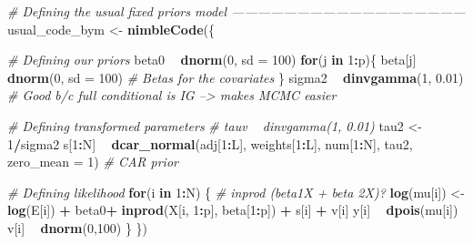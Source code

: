 \documentclass[]{article}
\newenvironment{Shaded}{\begin{snugshade}}{\end{snugshade}}
\newcommand{\CommentTok}[1]{\textcolor[rgb]{0.56,0.35,0.01}{\textit{#1}}}
\newcommand{\ControlFlowTok}[1]{\textcolor[rgb]{0.13,0.29,0.53}{\textbf{#1}}}
\newcommand{\DataTypeTok}[1]{\textcolor[rgb]{0.13,0.29,0.53}{#1}}
\newcommand{\DecValTok}[1]{\textcolor[rgb]{0.00,0.00,0.81}{#1}}
\newcommand{\FloatTok}[1]{\textcolor[rgb]{0.00,0.00,0.81}{#1}}
\newcommand{\KeywordTok}[1]{\textcolor[rgb]{0.13,0.29,0.53}{\textbf{#1}}}
\newcommand{\NormalTok}[1]{#1}
\newcommand{\OperatorTok}[1]{\textcolor[rgb]{0.81,0.36,0.00}{\textbf{#1}}}
\newcommand{\StringTok}[1]{\textcolor[rgb]{0.31,0.60,0.02}{#1}}
\begin{document}
\begin{Shaded}
\begin{Highlighting}[]
\CommentTok{# Defining the usual fixed priors model ------------------------------------------------------}
\NormalTok{usual_code_bym <-}\StringTok{ }\KeywordTok{nimbleCode}\NormalTok{(\{ }

  \CommentTok{# Defining our priors}
\NormalTok{  beta0 }\OperatorTok{~}\StringTok{ }\KeywordTok{dnorm}\NormalTok{(}\DecValTok{0}\NormalTok{, }\DataTypeTok{sd =} \DecValTok{100}\NormalTok{)}
  \ControlFlowTok{for}\NormalTok{(j }\ControlFlowTok{in} \DecValTok{1}\OperatorTok{:}\NormalTok{p)\{}
\NormalTok{    beta[j] }\OperatorTok{~}\StringTok{ }\KeywordTok{dnorm}\NormalTok{(}\DecValTok{0}\NormalTok{, }\DataTypeTok{sd =} \DecValTok{100}\NormalTok{)  }\CommentTok{# Betas for the covariates}
\NormalTok{  \}}
\NormalTok{  sigma2 }\OperatorTok{~}\StringTok{ }\KeywordTok{dinvgamma}\NormalTok{(}\DecValTok{1}\NormalTok{, }\FloatTok{0.01}\NormalTok{)     }\CommentTok{# Good b/c full conditional is IG --> makes MCMC easier}

  \CommentTok{# Defining transformed parameters}
  \CommentTok{# tauv ~ dinvgamma(1, 0.01) }
\NormalTok{  tau2 <-}\StringTok{ }\DecValTok{1}\OperatorTok{/}\NormalTok{sigma2}
\NormalTok{  s[}\DecValTok{1}\OperatorTok{:}\NormalTok{N] }\OperatorTok{~}\StringTok{ }\KeywordTok{dcar_normal}\NormalTok{(adj[}\DecValTok{1}\OperatorTok{:}\NormalTok{L], weights[}\DecValTok{1}\OperatorTok{:}\NormalTok{L], num[}\DecValTok{1}\OperatorTok{:}\NormalTok{N], tau2, }\DataTypeTok{zero_mean =} \DecValTok{1}\NormalTok{) }\CommentTok{# CAR prior}

  \CommentTok{# Defining likelihood}
  \ControlFlowTok{for}\NormalTok{(i }\ControlFlowTok{in} \DecValTok{1}\OperatorTok{:}\NormalTok{N) \{ }\CommentTok{# inprod (beta1X + beta 2X)?}
    \KeywordTok{log}\NormalTok{(mu[i]) <-}\StringTok{ }\KeywordTok{log}\NormalTok{(E[i]) }\OperatorTok{+}\StringTok{ }\NormalTok{beta0}\OperatorTok{+}\StringTok{ }\KeywordTok{inprod}\NormalTok{(X[i, }\DecValTok{1}\OperatorTok{:}\NormalTok{p], beta[}\DecValTok{1}\OperatorTok{:}\NormalTok{p]) }\OperatorTok{+}\StringTok{ }\NormalTok{s[i] }\OperatorTok{+}\StringTok{ }\NormalTok{v[i] }
\NormalTok{    y[i] }\OperatorTok{~}\StringTok{ }\KeywordTok{dpois}\NormalTok{(mu[i]) }
\NormalTok{    v[i] }\OperatorTok{~}\StringTok{ }\KeywordTok{dnorm}\NormalTok{(}\DecValTok{0}\NormalTok{,}\DecValTok{100}\NormalTok{) }
\NormalTok{  \}}
\NormalTok{\})}
\end{Highlighting}
\end{Shaded}
\end{document}
